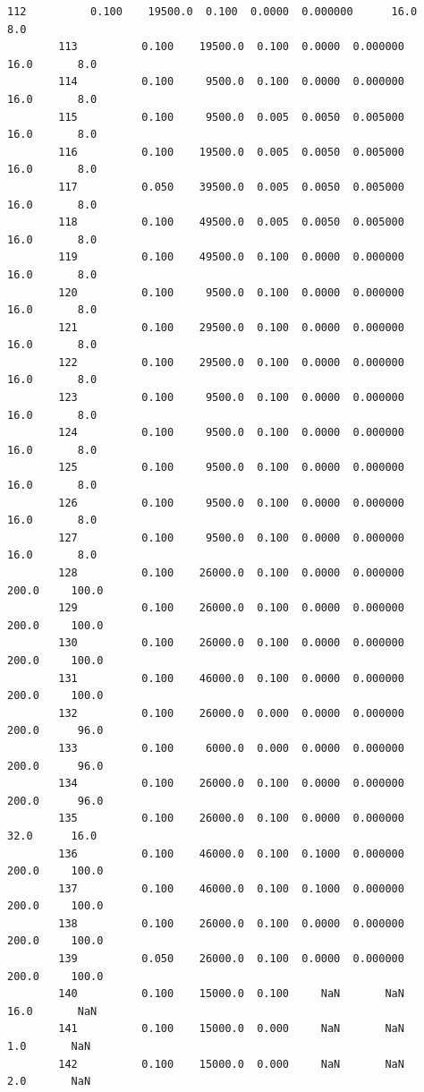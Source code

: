 \documentclass[11pt, a4paper , landscape]{article}
\begin{document}
\begin{Verbatim}[commandchars=\\\{\}]
        112          0.100    19500.0  0.100  0.0000  0.000000      16.0       8.0   
        113          0.100    19500.0  0.100  0.0000  0.000000      16.0       8.0   
        114          0.100     9500.0  0.100  0.0000  0.000000      16.0       8.0   
        115          0.100     9500.0  0.005  0.0050  0.005000      16.0       8.0   
        116          0.100    19500.0  0.005  0.0050  0.005000      16.0       8.0   
        117          0.050    39500.0  0.005  0.0050  0.005000      16.0       8.0   
        118          0.100    49500.0  0.005  0.0050  0.005000      16.0       8.0   
        119          0.100    49500.0  0.100  0.0000  0.000000      16.0       8.0   
        120          0.100     9500.0  0.100  0.0000  0.000000      16.0       8.0   
        121          0.100    29500.0  0.100  0.0000  0.000000      16.0       8.0   
        122          0.100    29500.0  0.100  0.0000  0.000000      16.0       8.0   
        123          0.100     9500.0  0.100  0.0000  0.000000      16.0       8.0   
        124          0.100     9500.0  0.100  0.0000  0.000000      16.0       8.0   
        125          0.100     9500.0  0.100  0.0000  0.000000      16.0       8.0   
        126          0.100     9500.0  0.100  0.0000  0.000000      16.0       8.0   
        127          0.100     9500.0  0.100  0.0000  0.000000      16.0       8.0   
        128          0.100    26000.0  0.100  0.0000  0.000000     200.0     100.0   
        129          0.100    26000.0  0.100  0.0000  0.000000     200.0     100.0   
        130          0.100    26000.0  0.100  0.0000  0.000000     200.0     100.0   
        131          0.100    46000.0  0.100  0.0000  0.000000     200.0     100.0   
        132          0.100    26000.0  0.000  0.0000  0.000000     200.0      96.0   
        133          0.100     6000.0  0.000  0.0000  0.000000     200.0      96.0   
        134          0.100    26000.0  0.100  0.0000  0.000000     200.0      96.0   
        135          0.100    26000.0  0.100  0.0000  0.000000      32.0      16.0   
        136          0.100    46000.0  0.100  0.1000  0.000000     200.0     100.0   
        137          0.100    46000.0  0.100  0.1000  0.000000     200.0     100.0   
        138          0.100    26000.0  0.100  0.0000  0.000000     200.0     100.0   
        139          0.050    26000.0  0.100  0.0000  0.000000     200.0     100.0   
        140          0.100    15000.0  0.100     NaN       NaN      16.0       NaN   
        141          0.100    15000.0  0.000     NaN       NaN       1.0       NaN   
        142          0.100    15000.0  0.000     NaN       NaN       2.0       NaN   

\end{Verbatim}
\end{document}
